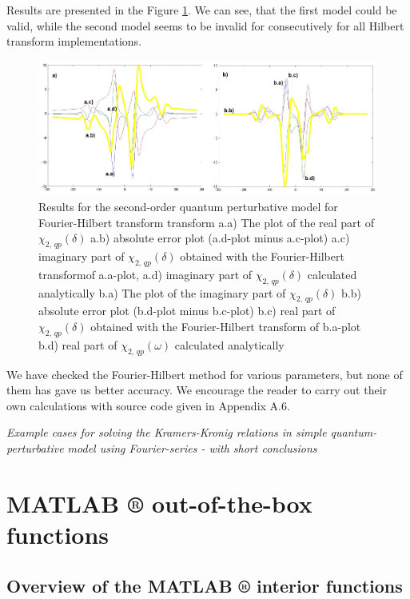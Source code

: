 \documentclass[12pt,twoside,a4paper]{article}
\numberwithin{equation}{subsection}
\numberwithin{figure}{subsection}
\begin{document}
Results are presented in the Figure \ref{fig:four_qp2}. We can see, that the first model could be valid, while the second model
seems to be invalid for consecutively for all Hilbert transform implementations.

\begin{figure} 
  \includegraphics[width=150mm]{img/four_qp2.png}
  \caption{Results for the second-order quantum perturbative model for Fourier-Hilbert transform transform
     a.a) The plot of the real part of ${\chi_{2, \,qp}}(\delta )$
     a.b) absolute error plot (a.d-plot minus a.c-plot)
     a.c) imaginary part of ${\chi_{2, \,qp}}(\delta )$ obtained with the Fourier-Hilbert transformof a.a-plot, 
     a.d) imaginary part of ${\chi_{2, \,qp}}(\delta )$ calculated analytically 
     b.a) The plot of the imaginary part of ${\chi_{2, \,qp}}(\delta )$ 
     b.b) absolute error plot (b.d-plot minus b.c-plot)
     b.c) real part of ${\chi_{2, \,qp}}(\delta )$ obtained with the Fourier-Hilbert transform of b.a-plot 
     b.d) real part of $\chi_{2, \,qp} (\omega )$ calculated analytically 
     \label{fig:four_qp2}
     }
\end{figure} 

We have checked the Fourier-Hilbert method for various parameters, but none of them has gave us better accuracy. We
encourage the reader to carry out their own calculations with source code given in Appendix A.6.

\textit{Example cases for solving the Kramers-Kronig relations in simple quantum-perturbative model using Fourier-series - with
short conclusions}


\section{MATLAB ® out-of-the-box functions} \label{chap:matlab}

\subsection{Overview of the MATLAB ® interior functions} \label{chap:matlab_overview}
\end{document}
